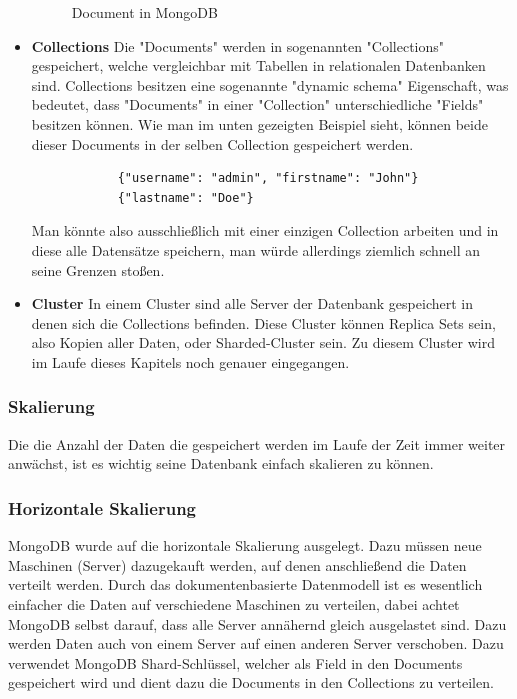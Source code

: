 \begin{itemize}
\begin{figure}[h!]
            \caption{Document in MongoDB}
            \cite{mongodb_document}
            \label{fig:enter-label}
        \end{figure}
        \cite{mongodb_json_vs_bson}
    \item \textbf{Collections}
        \newline
        Die "Documents" werden in sogenannten "Collections" gespeichert, welche vergleichbar mit Tabellen in relationalen Datenbanken sind. Collections besitzen eine sogenannte "dynamic schema" Eigenschaft, was bedeutet, dass "Documents" in einer "Collection" unterschiedliche "Fields" besitzen können. Wie man im unten gezeigten Beispiel sieht, können beide dieser Documents in der selben Collection gespeichert werden.
        \begin{lstlisting}
            {"username": "admin", "firstname": "John"}
            {"lastname": "Doe"}
        \end{lstlisting}
        Man könnte also ausschließlich mit einer einzigen Collection arbeiten und in diese alle Datensätze speichern, man würde allerdings ziemlich schnell an seine Grenzen stoßen.
    \item \textbf{Cluster}
        \newline
        In einem Cluster sind alle Server der Datenbank gespeichert in denen sich die Collections befinden. Diese Cluster können Replica Sets sein, also Kopien aller Daten, oder Sharded-Cluster sein. Zu diesem Cluster wird im Laufe dieses Kapitels noch genauer eingegangen.
        \cite{mongodb_collections}
\end{itemize}

\subsubsection{Skalierung}
Die die Anzahl der Daten die gespeichert werden im Laufe der Zeit immer weiter anwächst, ist es wichtig seine Datenbank einfach skalieren zu können. 

\subsubsection{Horizontale Skalierung}
MongoDB wurde auf die horizontale Skalierung ausgelegt. Dazu müssen neue Maschinen (Server) dazugekauft werden, auf denen anschließend die Daten verteilt werden. Durch das dokumentenbasierte Datenmodell ist es wesentlich einfacher die Daten auf verschiedene Maschinen zu verteilen, dabei achtet MongoDB selbst darauf, dass alle Server annähernd gleich ausgelastet sind. Dazu werden Daten auch von einem Server auf einen anderen Server verschoben. Dazu verwendet MongoDB Shard-Schlüssel, welcher als Field in den Documents gespeichert wird und dient dazu die Documents in den Collections zu verteilen.
\cite{mongodb_collections}

